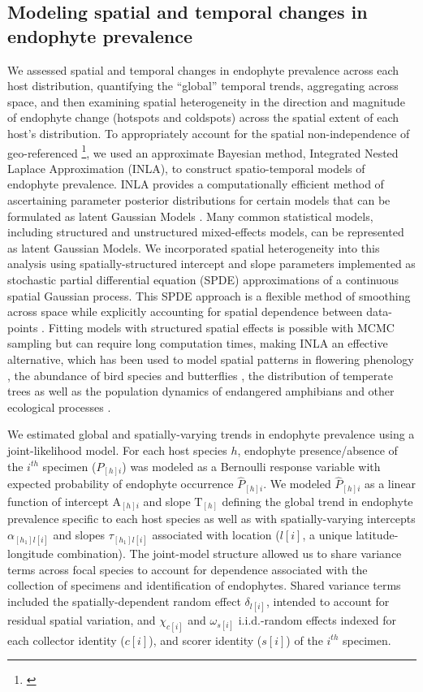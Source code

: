 \documentclass[11pt]{article}
\let\cite\citep
\newcommand{\josh}[2]{{\color{orange}{#1}}\footnote{\textit{\color{orange}{#2}}}}
\begin{document}
\subsection*{Modeling spatial and temporal changes in endophyte prevalence}
We assessed spatial and temporal changes in endophyte prevalence across each host distribution, quantifying the ``global'' temporal trends, aggregating across space, and then examining spatial heterogeneity in the direction and magnitude of endophyte change (hotspots and coldspots) across the spatial extent of each host's distribution.
To appropriately account for the spatial non-independence of geo-referenced \josh{occurrences}{spelling?}, we used an approximate Bayesian method, Integrated Nested Laplace Approximation (INLA), to construct spatio-temporal models of endophyte prevalence.
INLA provides a computationally efficient method of ascertaining parameter posterior distributions for certain models that can be formulated as latent Gaussian Models \cite{rue2009approximate}.
Many common statistical models, including structured and unstructured mixed-effects models, can be represented as latent Gaussian Models.
We incorporated spatial heterogeneity into this analysis using spatially-structured intercept and slope parameters implemented as stochastic partial differential equation (SPDE) approximations of a continuous spatial Gaussian process. 
This SPDE approach is a flexible method of smoothing across space while explicitly accounting for spatial dependence between data-points \citep{lindgren2011explicit,bakka2018spatial}.
Fitting models with structured spatial effects is possible with MCMC sampling but can require long computation times, making INLA an effective alternative, which has been used to model spatial patterns in flowering phenology \cite{willems2022forest}, the abundance of bird species \cite{meehan2019spatial} and butterflies \cite{crossley2022opposing}, the distribution of temperate trees \cite{engel2022spatial} as well as the population dynamics of endangered amphibians \cite{knapp2016large} and other ecological processes \cite{beguin2012hierarchical}.

We estimated global and spatially-varying trends in endophyte prevalence using a joint-likelihood model. 
For each host species $h$, endophyte presence/absence of the $i^{th}$ specimen ($P_{[h]i}$) was modeled as a Bernoulli response variable with expected probability of endophyte occurrence $\hat{P}_{[h]i}$.
We modeled $\hat{P}_{[h]i}$ as a linear function of intercept $ \mathrm{A}_{[h]i}$ and slope $\mathrm{T}_{[h]}$ defining the global trend in endophyte prevalence specific to each host species as well as with spatially-varying intercepts $\alpha_{[h_{1}]l[i]}$ and slopes $\tau_{[h_{1}]l[i]}$ associated with location ($l[i]$, a unique latitude-longitude combination).
The joint-model structure allowed us to share variance terms across focal species to account for dependence associated with the collection of specimens and identification of endophytes. 
Shared variance terms included the spatially-dependent random effect $\delta_{l[i]}$, intended to account for residual spatial variation, and $\chi_{c[i]}$ and $\omega_{s[i]}$ i.i.d.-random effects indexed for each collector identity ($c[i]$), and scorer identity ($s[i]$) of the $i^{th}$ specimen.
\end{document}
